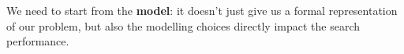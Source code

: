 We need to start from the \textbf{model}: it doesn't just give us a formal representation of our problem, but also the modelling choices directly 
impact the search performance.
